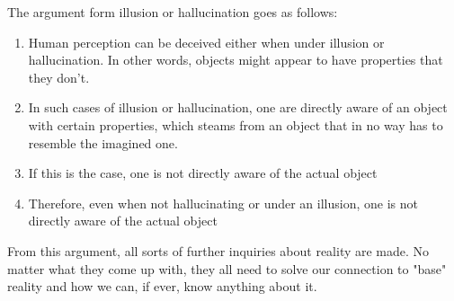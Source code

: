 \documentclass[fleqn,14pt]{article}
\begin{document}

The argument form illusion or hallucination goes as follows\cite[p.295]{sosa}:

\begin{enumerate}
  \item Human perception can be deceived either when under illusion or
  hallucination. In other words, objects might appear to have properties that
  they don't.
  \item In such cases of illusion or hallucination, one are directly aware of an
  object with certain properties, which steams from an object that in no way
  has to resemble the imagined one.
  \item If this is the case, one is not directly aware of the actual object 
  \item Therefore, even when not hallucinating or under an illusion, one is not directly aware
  of the actual object
\end{enumerate}
From this argument, all sorts of further inquiries about reality are made. No matter what they
come up with,
they all need to solve our connection to "base" reality and how we can, if ever, know anything about it.\\
\end{document}

